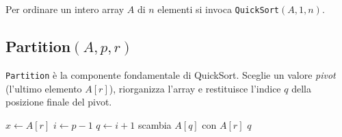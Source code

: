 \begin{nota}
	Per ordinare un intero array $A$ di $n$ elementi si invoca
	\texttt{QuickSort}$(A, 1, n)$.
\end{nota}

\subsection{\texorpdfstring{Partition$(A, p, r)$}{Partition(A, p, r)}}

\begin{softnote}
	\texttt{Partition} è la componente fondamentale di QuickSort.
	Sceglie un valore \emph{pivot} (l'ultimo elemento $A[r]$),
	riorganizza l'array e restituisce l'indice $q$ della posizione
	finale del pivot.
\end{softnote}

\begin{algorithm}[H]
	\caption{Partition$(A, p, r)$}
	$x \gets A[r]$
	$i \gets p - 1$
	$q \gets i + 1$
	scambia $A[q]$ con $A[r]$\;
	\Return $q$\;
\end{algorithm}

